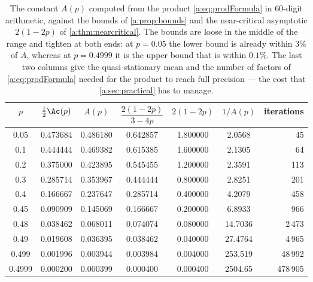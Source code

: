 \begin{table}[ht]
\centering
\caption{The constant $A(p)$ computed from the product \cref{a:eq:prodFormula} in
$60$-digit arithmetic, against the bounds of \cref{a:prop:bounds} and the
near-critical asymptotic $2(1-2p)$ of \cref{a:thm:nearcritical}. The bounds are
loose in the middle of the range and tighten at both ends: at $p=0.05$ the lower
bound is already within $3\%$ of $A$, whereas at $p=0.4999$ it is the upper bound
that is within $0.1\%$. The last two columns give the quasi-stationary mean and the
number of factors of \cref{a:eq:prodFormula} needed for the product to reach full
precision --- the cost that \cref{a:sec:practical} has to manage.}
\label{a:tab:Avals}
\begin{tabular}{ccccccr}
\toprule
$p$ & $\tfrac12\Ac(p)$ & $A(p)$ & $\dfrac{2(1-2p)}{3-4p}$ & $2(1-2p)$ & $1/A(p)$ & iterations\\
\midrule
0.05   & 0.473684 & 0.486180 & 0.642857 & 1.800000 & 2.0568 & 45 \\
0.1    & 0.444444 & 0.469382 & 0.615385 & 1.600000 & 2.1305 & 64 \\
0.2    & 0.375000 & 0.423895 & 0.545455 & 1.200000 & 2.3591 & 113 \\
0.3    & 0.285714 & 0.353967 & 0.444444 & 0.800000 & 2.8251 & 201 \\
0.4    & 0.166667 & 0.237647 & 0.285714 & 0.400000 & 4.2079 & 458 \\
0.45   & 0.090909 & 0.145069 & 0.166667 & 0.200000 & 6.8933 & 966 \\
0.48   & 0.038462 & 0.068011 & 0.074074 & 0.080000 & 14.7036 & 2\,473 \\
0.49   & 0.019608 & 0.036395 & 0.038462 & 0.040000 & 27.4764 & 4\,965 \\
0.499  & 0.001996 & 0.003944 & 0.003984 & 0.004000 & 253.519 & 48\,992 \\
0.4999 & 0.000200 & 0.000399 & 0.000400 & 0.000400 & 2504.65 & 478\,905 \\
\bottomrule
\end{tabular}
\end{table}
